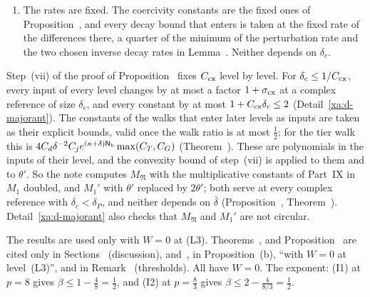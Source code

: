 \begin{detail}
\begin{step}
\begin{enumerate}[label=(\roman*)]
\item The rates are fixed. The coercivity constants are the fixed ones of Proposition~, and every decay bound that enters is taken at the fixed rate of the differences there, a quarter of the minimum of the perturbation rate and the two chosen inverse decay rates in Lemma~. Neither depends on $\delta_c$.
\end{enumerate}
Step~(vii) of the proof of Proposition~ fixes $C_{\rm cx}$ level by level. For $\delta_c\le1/C_{\rm cx}$, every input of every level changes by at most a factor $1+\sigma_{\rm cx}$ at a complex reference of size $\delta_c$, and every constant by at most $1+C_{\rm cx}\delta_c\le2$ (Detail~\ref{xa:d-majorant}). The constants of the walks that enter later levels as inputs are taken as their explicit bounds, valid once the walk ratio is at most $\frac12$; for the tier walk this is $4C_d\delta^{-2}C_je^{(\kappa+\delta)\mathsf N_{\rm b}}\max(C_T,C_G)$ (Theorem~). These are polynomials in the inputs of their level, and the convexity bound of step~(vii) is applied to them and to $\theta'$. So the note computes $M_{\mathfrak N}$ with the multiplicative constants of Part~IX in $M_1$ doubled, and $M_1'$ with $\theta'$ replaced by $2\theta'$; both serve at every complex reference with $\delta_c<\delta_P$, and neither depends on $\bar\delta$ (Proposition~, Theorem~). Detail~\ref{xa:d-majorant} also checks that $M_{\mathfrak N}$ and $M_1'$ are not circular.
\end{step}
\end{detail}

\begin{detail}\label{d9:nl-scope}
The results are used only with $W=0$ at (L3). Theorems~,  and Proposition~ are cited only in Sections~ (discussion),  and~, in Proposition~(b), ``with $W=0$ at level~(L3)'', and in Remark~ (thresholds). All have $W=0$. The exponent: (I1) at $p=8$ gives $\beta\le1-\frac48=\frac12$, and (I2) at $p=\frac83$ gives $\beta\le2-\frac{4}{8/3}=\frac12$.
\end{detail}

